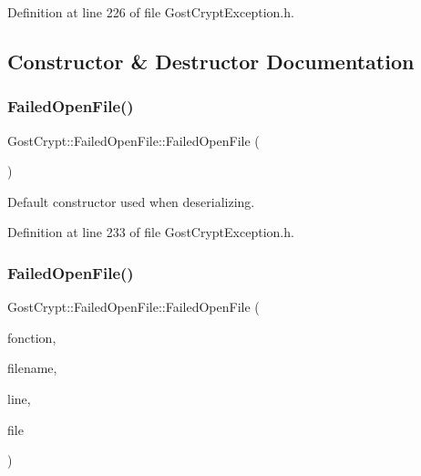 Definition at line 226 of file Gost\+Crypt\+Exception.\+h.



\subsection{Constructor \& Destructor Documentation}
\mbox{\label{class_gost_crypt_1_1_failed_open_file_a6521b444189df37b28d06dcafe4a9bba}} 
\subsubsection{\texorpdfstring{Failed\+Open\+File()}{FailedOpenFile()}\hspace{0.1cm}{\footnotesize\ttfamily [1/2]}}
{\footnotesize\ttfamily Gost\+Crypt\+::\+Failed\+Open\+File\+::\+Failed\+Open\+File (\begin{DoxyParamCaption}{ }\end{DoxyParamCaption})\hspace{0.3cm}{\ttfamily [inline]}}



Default constructor used when deserializing. 



Definition at line 233 of file Gost\+Crypt\+Exception.\+h.

\mbox{\label{class_gost_crypt_1_1_failed_open_file_a3f4cc9ec3ccc83c8eecf910a313a02ae}} 
\subsubsection{\texorpdfstring{Failed\+Open\+File()}{FailedOpenFile()}\hspace{0.1cm}{\footnotesize\ttfamily [2/2]}}
{\footnotesize\ttfamily Gost\+Crypt\+::\+Failed\+Open\+File\+::\+Failed\+Open\+File (\begin{DoxyParamCaption}\item[{Q\+String}]{fonction,  }\item[{Q\+String}]{filename,  }\item[{quint32}]{line,  }\item[{Q\+File\+Info}]{file }\end{DoxyParamCaption})\hspace{0.3cm}{\ttfamily [inline]}}



